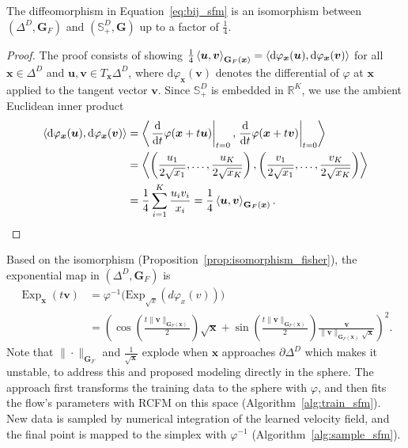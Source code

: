 \begin{proposition}
\label{prop:isomorphism_fisher}
The diffeomorphism in Equation~\ref{eq:bij_sfm} is an isomorphism between $(\Delta^D  , \mathbf{G}_F)$  and $(\mathbb{S}_{+}^{D}, \mathbf{G})$ up to a factor of $\frac{1}{4}$.
\end{proposition}
\begin{proof}
    The proof consists of showing
    $
    \frac{1}{4}\left\langle \boldsymbol{u}, \boldsymbol{v} \right\rangle_{\mathbf{G}_F(\boldsymbol{x})}
    =
    \left\langle \mathrm{d}\varphi_{\boldsymbol{x}}(\boldsymbol{u}), \mathrm{d}\varphi_{\boldsymbol{x}}(\boldsymbol{v}) \right\rangle
    $
    for all $\boldsymbol{x}\in \Delta^D$ and $\boldsymbol{u},\boldsymbol{v}\in T_{\boldsymbol{x}}\Delta^D$, where $\mathrm{d}\varphi_{\boldsymbol{x}}(\boldsymbol{v})$ denotes the differential of $\varphi$ at $\boldsymbol{x}$ applied to the tangent vector $\boldsymbol{v}$. Since $\mathbb{S}_{+}^{D}$ is embedded in $\mathbb{R}^K$, we use the ambient Euclidean inner product
    \begin{align*}
        \inp{\mathrm{d}\varphi_{\boldsymbol{x}}(\boldsymbol{u})}{\mathrm{d}\varphi_{\boldsymbol{x}}(\boldsymbol{v})}
        &=
        \inp{\eval{\dv{}{t}\varphi(\boldsymbol{x}+t\boldsymbol{u})}_{t=0}}
            {\eval{\dv{}{t}\varphi(\boldsymbol{x}+t\boldsymbol{v})}_{t=0}} \\
        &=
        \inp{ \left(
\frac{u_1}{2\sqrt{x_1}},\dots,\frac{u_K}{2\sqrt{x_K}}
\right) }
            {\left(
\frac{v_1}{2\sqrt{x_1}},\dots,\frac{v_K}{2\sqrt{x_K}}
\right)} \\
        &= \frac{1}{4}\sum_{i=1}^K \frac{u_i v_i}{x_i}
        = \frac{1}{4}\inp{\boldsymbol{u}}{\boldsymbol{v}}_{\mathbf{G}_F(\boldsymbol{x})}.
    \end{align*}
\end{proof}
Based on the isomorphism (Proposition~\ref{prop:isomorphism_fisher}), the exponential map in $(\Delta^D  , \mathbf{G}_F)$ is 
\begin{align*}
\operatorname{Exp}_{\boldsymbol{x}}( t \boldsymbol{v})  &= \varphi^{-1}\big(\mathrm{Exp}_{\sqrt{x}}(d\varphi_x(v))\big) \\
& = \left(
\cos\!\left(\frac{t\|\boldsymbol{v}\|_{\mathbf{G}_F(\boldsymbol{x})}}{2}\right)\sqrt{\boldsymbol{x}}
+
\sin\!\left(\frac{t\|\boldsymbol{v}\|_{\mathbf{G}_F(\boldsymbol{x})}}{2}\right)
\frac{\boldsymbol{v}}{\|\boldsymbol{v}\|_{\mathbf{G}_F(\boldsymbol{x})}\sqrt{\boldsymbol{x}}}
\right)^2.
\label{eq:geo_simplex}
\end{align*}
Note that $\|\cdot \|_{\mathbf{G}_F}$ and $\tfrac{1}{\sqrt{\boldsymbol{x}}}$ explode when $\boldsymbol{x}$ approaches $\partial \Delta^D$ which makes it unstable, to address this  \citet{Cheng2024} and \cite{Davis2024} proposed modeling directly in the sphere. The approach first transforms the training data to the sphere with $\varphi$, and then fits the flow's parameters with RCFM on this space (Algorithm~\ref{alg:train_sfm}). New data is sampled by numerical integration of the learned velocity field, and the final point is mapped to the simplex with $\varphi^{-1}$ (Algorithm~\ref{alg:sample_sfm}).

